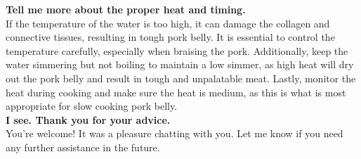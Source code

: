 \documentclass[11pt]{article}
\begin{document}
\begin{tcolorbox}[colback=white,colframe=black!75!black,title=RWKV-4-Raven-14B]
\textbf{Tell me more about the proper heat and timing.}\\

If the temperature of the water is too high, it can damage the collagen and connective tissues, resulting in tough pork belly. It is essential to control the temperature carefully, especially when braising the pork. Additionally, keep the water simmering but not boiling to maintain a low simmer, as high heat will dry out the pork belly and result in tough and unpalatable meat. Lastly, monitor the heat during cooking and make sure the heat is medium, as this is what is most appropriate for slow cooking pork belly.\\

\textbf{I see. Thank you for your advice.}\\

You're welcome! It was a pleasure chatting with you. Let me know if you need any further assistance in the future.\\

\end{tcolorbox}
\end{document}
